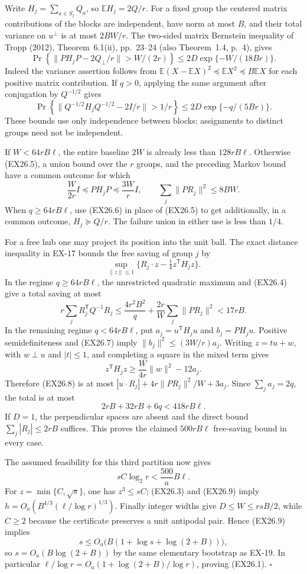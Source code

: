 Write $H_j=\sum_{a\in S_j}Q_a$, so $\mathbb EH_j=2Q/r$.
For a fixed group the centered matrix contributions of the
blocks are independent, have norm at most $B$, and their
total variance on $u^\perp$ is at most $2BW/r$.
The two-sided matrix Bernstein inequality of Tropp (2012),
Theorem~6.1(ii), pp.~23--24 (also Theorem~1.4, p.~4), gives
\[
 \Pr\!\left\{\|PH_jP-2Q_\perp/r\|>W/(2r)\right\}
 \le2D\exp\{-W/(18Br)\}.
 \tag{EX26.5}
\]
Indeed the variance assertion follows from
$\mathbb E(X-\mathbb EX)^2\preceq\mathbb EX^2
\preceq B\mathbb EX$ for each positive matrix contribution.
If $q>0$, applying the same argument after conjugation by
$Q^{-1/2}$ gives
\[
 \Pr\!\left\{\|Q^{-1/2}H_jQ^{-1/2}-2I/r\|>1/r\right\}
 \le2D\exp\{-q/(5Br)\}.
 \tag{EX26.6}
\]
These bounds use only independence between blocks; assignments
to distinct groups need not be independent.

If $W<64rB\ell$, the entire baseline $2W$ is already less than
$128rB\ell$. Otherwise (EX26.5), a union bound over the $r$
groups, and the preceding Markov bound have a common outcome
for which
\[
 \frac{W}{2r}I\preceq PH_jP\preceq\frac{3W}{r}I,
 \qquad \sum_j\|PR_j\|^2\le8BW.
 \tag{EX26.7}
\]
When $q\ge64rB\ell$, use (EX26.6) in place of (EX26.5)
to get additionally, in a common outcome, $H_j\succeq Q/r$.
The failure union in either use is less than $1/4$.

For a free hub one may project its position into the unit ball.
The exact distance inequality in EX-17 bounds the free saving
of group $j$ by
\[
 \sup_{\|z\|\le1}
       \{R_j\cdot z-\tfrac14z^{\mathsf T}H_jz\}.
 \tag{EX26.8}
\]
In the regime $q\ge64rB\ell$, the unrestricted quadratic
maximum and (EX26.4) give a total saving at most
\[
 r\sum_jR_j^{\mathsf T}Q^{-1}R_j
 \le\frac{4r^2B^2}{q}
          +\frac{2r}{W}\sum_j\|PR_j\|^2
 <17rB.
\]
In the remaining regime $q<64rB\ell$, put
$a_j=u^{\mathsf T}H_ju$ and $b_j=PH_ju$.
Positive semidefiniteness and (EX26.7) imply
$\|b_j\|^2\le(3W/r)a_j$. Writing $z=tu+w$, with
$w\perp u$ and $|t|\le1$, and completing a square in the
mixed term gives
\[
 z^{\mathsf T}H_jz
 \ge\frac{W}{4r}\|w\|^2-12a_j.
\]
Therefore (EX26.8) is at most
$|u\cdot R_j|+4r\|PR_j\|^2/W+3a_j$.
Since $\sum_ja_j=2q$, the total is at most
\[
 2rB+32rB+6q<418rB\ell.
\]
If $D=1$, the perpendicular spaces are absent and the direct
bound $\sum_j|R_j|\le2rB$ suffices. This proves the claimed
$500rB\ell$ free-saving bound in every case.

The assumed feasibility for this third partition now gives
\[
 sC\log_2r<\frac{500}{a}B\ell.
 \tag{EX26.9}
\]
For $z=\min\{C,\sqrt s\}$, one has $z^3\le sC$;
(EX26.3) and (EX26.9) imply
$h=O_a(B^{4/3}(\ell/\log r)^{1/3})$.
Finally integer widths give $D\le W\le rsB/2$, while
$C\ge2$ because the certificate preserves a unit antipodal
pair. Hence (EX26.9) implies
\[
 s\le O_a\bigl(B(1+\log s+\log(2+B))\bigr),
\]
so $s=O_a(B\log(2+B))$ by the same elementary bootstrap as
EX-19. In particular
$\ell/\log r=O_a(1+\log(2+B)/\log r)$, proving (EX26.1).
\hfill$\square$

